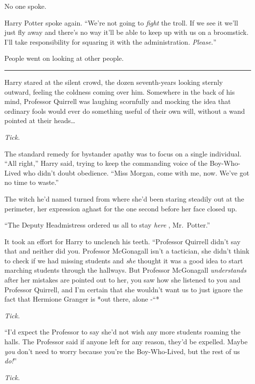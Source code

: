 No one spoke.

Harry Potter spoke again. ``We're not going to \emph{fight} the troll.
If we see it we'll just fly away and there's no way it'll be able to
keep up with us on a broomstick. I'll take responsibility for squaring
it with the administration. \emph{Please.}''

People went on looking at other people.

\begin{center}\rule{3in}{0.4pt}\end{center}

Harry stared at the silent crowd, the dozen seventh-years looking
sternly outward, feeling the coldness coming over him. Somewhere in the
back of his mind, Professor Quirrell was laughing scornfully and mocking
the idea that ordinary fools would ever do something useful of their own
will, without a wand pointed at their heads\ldots{}

\emph{Tick.}

The standard remedy for bystander apathy was to focus on a single
individual. ``All right,'' Harry said, trying to keep the commanding
voice of the Boy-Who-Lived who didn't doubt obedience. ``Miss Morgan,
come with me, now. We've got no time to waste.''

The witch he'd named turned from where she'd been staring steadily out
at the perimeter, her expression aghast for the one second before her
face closed up.

``The Deputy Headmistress ordered us all to stay \emph{here} ,
Mr.~Potter.''

It took an effort for Harry to unclench his teeth. ``Professor Quirrell
didn't say that and neither did you. Professor McGonagall isn't a
tactician, she didn't think to check if we had missing students and
\emph{she} thought it was a good idea to start marching students through
the hallways. But Professor McGonagall \emph{understands} after her
mistakes are pointed out to her, you saw how she listened to you and
Professor Quirrell, and I'm certain that she wouldn't want us to just
ignore the fact that Hermione Granger is *out there, alone -``*

\emph{Tick.}

``I'd expect the Professor to say she'd not wish any more students
roaming the halls. The Professor said if anyone left for any reason,
they'd be expelled. Maybe \emph{you} don't need to worry because you're
the Boy-Who-Lived, but the rest of us \emph{do!}''

\emph{Tick.}

